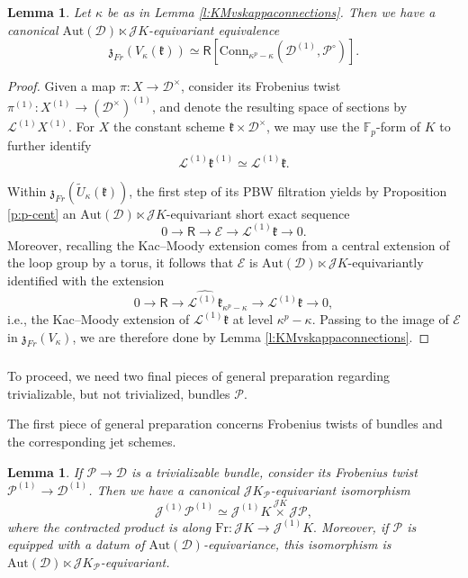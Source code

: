 \documentclass{amsart}
\newtheorem{Lem}[Thm]{Lemma}
\theoremstyle{definition}
\newcommand{\fk}{\mathfrak{k}}
\newcommand{\sss}{\subsubsection{}}
\newcommand{\fr}{^\on{(1)}}
\newcommand{\sD}{\mathscr{D}}
\newcommand{\on}{\mathrm}
\newcommand{\Ring}{\mathsf{R}}
\newcommand{\sP}{\mathscr{P}}
\newcommand{\Jet}{\mathscr{J}}
\newcommand{\Loop}{\mathscr{L}}
\newcommand{\Conn}{\on{Conn}}
\newcommand{\Aut}{\on{Aut}}
\numberwithin{equation}{section}
\begin{document}
\begin{Lem}  \label{l:coordinvpcenter}Let $\kappa$ be as in Lemma \ref{l:KMvskappaconnections}. Then we have a canonical $\Aut(\sD) \ltimes \Jet K$-equivariant equivalence 
$$\mathfrak{z}_{Fr}(V_\kappa(\fk)) \simeq \Ring[\Conn_{\kappa^p - \kappa}(\sD\fr, \sP^\circ)]. $$
\end{Lem}

\begin{proof} Given a map $\pi: X \rightarrow \sD^\times$, consider its Frobenius twist $\pi\fr: X\fr \rightarrow (\sD^\times)\fr$, and denote the resulting space of sections by $\Loop\fr X\fr$. For $X$ the constant scheme $\fk \times \mathscr{D}^\times$, we may use the $\mathbb{F}_p$-form of $K$ to further identify $$\Loop\fr \fk\fr \simeq \Loop\fr \fk.$$


Within $\mathfrak{z}_{Fr}(\widetilde{U}_\kappa(\fk))$, the first step of its PBW filtration yields by Proposition \ref{p:p-cent} an $\Aut(\sD) \ltimes \Jet K$-equivariant short exact sequence 
$$0 \rightarrow \Ring \rightarrow \mathscr{E} \rightarrow \Loop\fr \fk \rightarrow 0.$$Moreover, recalling the Kac--Moody extension comes from a central extension of the loop group by a torus, it follows that $\mathscr{E}$ is $\Aut(\sD) \ltimes \Jet K$-equivariantly identified with the extension 
$$0 \rightarrow \Ring \rightarrow \widehat{\Loop\fr \fk}_{\kappa^p - \kappa} \rightarrow \Loop\fr \fk \rightarrow 0,$$i.e., the Kac--Moody extension of $\Loop\fr \fk$ at level $\kappa^p - \kappa$. 
Passing to the image of $\mathscr{E}$ in $\mathfrak{z}_{Fr}(V_\kappa)$, we are therefore done by Lemma \ref{l:KMvskappaconnections}. 
\end{proof}



\sss To proceed, we need two final pieces of general preparation regarding trivializable, but not trivialized, bundles $\sP$.


The first piece of general preparation concerns Frobenius twists of bundles and the corresponding jet schemes. 
\begin{Lem}\label{l:twistandjet}If $\sP \rightarrow \sD$ is a trivializable bundle, consider its Frobenius twist $\sP\fr \rightarrow \sD\fr$. Then we have a canonical $\Jet K_\sP$-equivariant isomorphism 
$$ \Jet\fr \sP\fr \simeq \Jet\fr K \overset{\Jet K} \times \Jet \sP,$$where the contracted product is along $\on{Fr}: \Jet K \rightarrow \Jet\fr K.$
Moreover, if $\sP$ is equipped with a datum of $\Aut(\sD)$-equivariance, this isomorphism is $\Aut(\sD) \ltimes \Jet K_\sP$-equivariant. 
\end{Lem}
\end{document}
